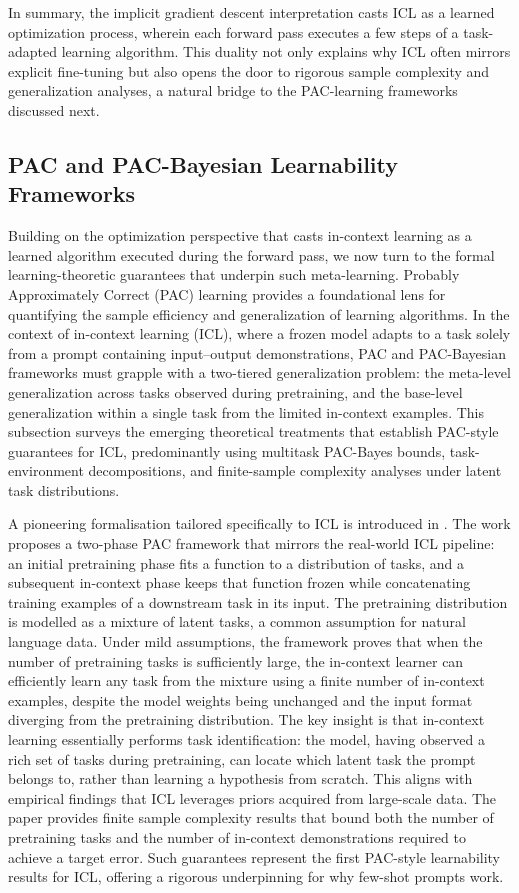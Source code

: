 \documentclass[11pt]{article}
\begin{document}
In summary, the implicit gradient descent interpretation casts ICL as a learned optimization process, wherein each forward pass executes a few steps of a task-adapted learning algorithm. This duality not only explains why ICL often mirrors explicit fine-tuning but also opens the door to rigorous sample complexity and generalization analyses, a natural bridge to the PAC-learning frameworks discussed next.

\subsection{PAC and PAC-Bayesian Learnability Frameworks}

Building on the optimization perspective that casts in-context learning as a learned algorithm executed during the forward pass, we now turn to the formal learning-theoretic guarantees that underpin such meta-learning. Probably Approximately Correct (PAC) learning provides a foundational lens for quantifying the sample efficiency and generalization of learning algorithms. In the context of in-context learning (ICL), where a frozen model adapts to a task solely from a prompt containing input--output demonstrations, PAC and PAC-Bayesian frameworks must grapple with a two-tiered generalization problem: the meta-level generalization across tasks observed during pretraining, and the base-level generalization within a single task from the limited in-context examples. This subsection surveys the emerging theoretical treatments that establish PAC-style guarantees for ICL, predominantly using multitask PAC-Bayes bounds, task-environment decompositions, and finite-sample complexity analyses under latent task distributions.

A pioneering formalisation tailored specifically to ICL is introduced in \cite{ref21}. The work proposes a two-phase PAC framework that mirrors the real-world ICL pipeline: an initial pretraining phase fits a function to a distribution of tasks, and a subsequent in-context phase keeps that function frozen while concatenating training examples of a downstream task in its input. The pretraining distribution is modelled as a mixture of latent tasks, a common assumption for natural language data. Under mild assumptions, the framework proves that when the number of pretraining tasks is sufficiently large, the in-context learner can efficiently learn any task from the mixture using a finite number of in-context examples, despite the model weights being unchanged and the input format diverging from the pretraining distribution. The key insight is that in-context learning essentially performs task identification: the model, having observed a rich set of tasks during pretraining, can locate which latent task the prompt belongs to, rather than learning a hypothesis from scratch. This aligns with empirical findings that ICL leverages priors acquired from large-scale data. The paper provides finite sample complexity results that bound both the number of pretraining tasks and the number of in-context demonstrations required to achieve a target error. Such guarantees represent the first PAC-style learnability results for ICL, offering a rigorous underpinning for why few-shot prompts work.
\end{document}
